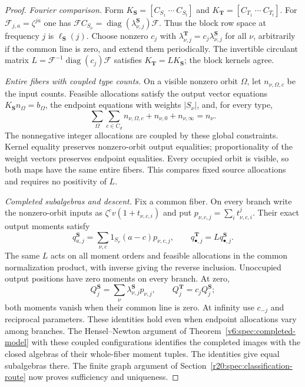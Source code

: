 \documentclass[10pt,fleqn]{article}
\numberwithin{equation}{section}
\begin{document}
\begin{proof}
\emph{Fourier comparison.}
Form $K_{\boldsymbol S}=[C_{S_1}\ \cdots\ C_{S_t}]$ and
$K_{\boldsymbol T}=[C_{T_1}\ \cdots\ C_{T_t}]$.
For $\mathcal F_{j,a}=\zeta^{ja}$ one has
$\mathcal FC_{S_\nu}=\operatorname{diag}(\lambda^{\boldsymbol S}_{\nu,j})\mathcal F$.
Thus the block row space at frequency $j$ is
$\ell_{\boldsymbol S}(j)$.  Choose nonzero $c_j$ with
$\lambda^{\boldsymbol T}_{\nu,j}=c_j\lambda^{\boldsymbol S}_{\nu,j}$
for all $\nu$, arbitrarily if the common line is zero, and extend them
periodically.  The invertible circulant matrix
$L=\mathcal F^{-1}\operatorname{diag}(c_j)\mathcal F$ satisfies
$K_{\boldsymbol T}=LK_{\boldsymbol S}$; the block kernels agree.

\emph{Entire fibers with coupled type counts.}
On a visible nonzero orbit $\Omega$, let $n_{\nu,\Omega,c}$ be the
input counts.  Feasible allocations satisfy the output vector equations
$K_{\boldsymbol S}n_\Omega=b_\Omega$, the endpoint equations with
weights $|S_\nu|$, and, for every type,
\[
 \sum_\Omega\sum_{c\in C_d}n_{\nu,\Omega,c}
       +n_{\nu,0}+n_{\nu,\infty}=n_\nu.
\]
The nonnegative integer allocations are coupled by these global
constraints.  Kernel equality preserves nonzero-orbit output equalities;
proportionality of the weight vectors preserves endpoint equalities.
Every occupied orbit is visible, so both maps have the same entire
fibers.  This compares fixed source allocations and requires no
positivity of $L$.

\emph{Completed subalgebras and descent.}
Fix a common fiber.  On every branch write the nonzero-orbit inputs as
$\zeta^cv(1+t_{\nu,c,i})$ and put
$p_{\nu,c,j}=\sum_i t_{\nu,c,i}^j$.  Their exact output moments satisfy
\[
 q^{\boldsymbol S}_{a,j}
 =\sum_{\nu,c}1_{S_\nu}(a-c)p_{\nu,c,j},\qquad
 q^{\boldsymbol T}_{\bullet,j}=Lq^{\boldsymbol S}_{\bullet,j}.
\]
The same $L$ acts on all moment orders and feasible allocations
in the common normalization product, with inverse giving the reverse
inclusion.  Unoccupied output positions have zero moments on every branch.  At zero,
\begin{equation}\label{v6:spec:mixed-zero-moments}
 Q_j^{\boldsymbol S}=\sum_\nu
       \lambda^{\boldsymbol S}_{\nu,j}p_{\nu,j},
 \qquad Q_j^{\boldsymbol T}=c_j Q_j^{\boldsymbol S};
\end{equation}
both moments vanish when their common line is zero.  At infinity use
$c_{-j}$ and reciprocal parameters.  These identities hold even when
endpoint allocations vary among branches.
The Hensel--Newton argument of Theorem~\ref{v6:spec:completed-model}
with these coupled configurations identifies the completed images
with the closed algebras of their whole-fiber moment tuples.
The identities give equal subalgebras there.
The finite graph argument of Section~\ref{r20:spec:classification-route}
now proves sufficiency and uniqueness.


\end{proof}
\end{document}
